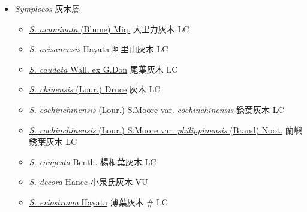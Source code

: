 
  \begin{itemize}
 \item[] \textit{Symplocos} 灰木屬
                                
  \begin{itemize}
        \item[] \href{http://www.theplantlist.org/tpl1.1/search?q=Symplocos+acuminata}{\textit{S. acuminata} (Blume) Miq.}   大里力灰木   LC
        \item[] \href{http://www.theplantlist.org/tpl1.1/search?q=Symplocos+arisanensis}{\textit{S. arisanensis} Hayata}   阿里山灰木   LC
        \item[] \href{http://www.theplantlist.org/tpl1.1/search?q=Symplocos+caudata}{\textit{S. caudata} Wall. ex G.Don}   尾葉灰木   LC
        \item[] \href{http://www.theplantlist.org/tpl1.1/search?q=Symplocos+chinensis}{\textit{S. chinensis} (Lour.) Druce}   灰木   LC
        \item[] \href{http://www.theplantlist.org/tpl1.1/search?q=Symplocos+cochinchinensis+var.+cochinchinensis}{\textit{S. cochinchinensis} (Lour.) S.Moore var. \textit{cochinchinensis}}   銹葉灰木   LC
        \item[] \href{http://www.theplantlist.org/tpl1.1/search?q=Symplocos+cochinchinensis+var.+philippinensis}{\textit{S. cochinchinensis} (Lour.) S.Moore var. \textit{philippinensis} (Brand) Noot.}   蘭嶼銹葉灰木   LC
        \item[] \href{http://www.theplantlist.org/tpl1.1/search?q=Symplocos+congesta}{\textit{S. congesta} Benth.}   楊桐葉灰木   LC
        \item[] \href{http://www.theplantlist.org/tpl1.1/search?q=Symplocos+decora}{\textit{S. decora} Hance}   小泉氏灰木   VU
        \item[] \href{http://www.theplantlist.org/tpl1.1/search?q=Symplocos+eriostroma}{\textit{S. eriostroma} Hayata}   薄葉灰木  \# LC

\end{itemize}
\end{itemize}
